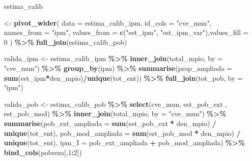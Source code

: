\documentclass[
  12pt,
]{book}
\newenvironment{Shaded}{\begin{snugshade}}{\end{snugshade}}
\newcommand{\AttributeTok}[1]{\textcolor[rgb]{0.13,0.29,0.53}{#1}}
\newcommand{\DecValTok}[1]{\textcolor[rgb]{0.00,0.00,0.81}{#1}}
\newcommand{\FunctionTok}[1]{\textcolor[rgb]{0.13,0.29,0.53}{\textbf{#1}}}
\newcommand{\NormalTok}[1]{#1}
\newcommand{\OtherTok}[1]{\textcolor[rgb]{0.56,0.35,0.01}{#1}}
\newcommand{\SpecialCharTok}[1]{\textcolor[rgb]{0.81,0.36,0.00}{\textbf{#1}}}
\newcommand{\StringTok}[1]{\textcolor[rgb]{0.31,0.60,0.02}{#1}}
\begin{document}
\begin{Shaded}
\begin{Highlighting}[]
\NormalTok{  estima\_calib}

 \OtherTok{\textless{}{-}} \FunctionTok{pivot\_wider}\NormalTok{(}
    \AttributeTok{data =}\NormalTok{ estima\_calib\_ipm,}
    \AttributeTok{id\_cols =} \StringTok{"cve\_mun"}\NormalTok{,}
    \AttributeTok{names\_from =} \StringTok{"ipm"}\NormalTok{,}
    \AttributeTok{values\_from =} \FunctionTok{c}\NormalTok{(}\StringTok{"est\_ipm"}\NormalTok{, }\StringTok{"est\_ipm\_var"}\NormalTok{),}\AttributeTok{values\_fill =} \DecValTok{0}
\NormalTok{  ) }\SpecialCharTok{\%\textgreater{}\%} \FunctionTok{full\_join}\NormalTok{(estima\_calib\_pob)}

\NormalTok{  valida\_ipm }\OtherTok{\textless{}{-}}\NormalTok{ estima\_calib\_ipm }\SpecialCharTok{\%\textgreater{}\%} \FunctionTok{inner\_join}\NormalTok{(total\_mpio, }\AttributeTok{by =} \StringTok{"cve\_mun"}\NormalTok{) }\SpecialCharTok{\%\textgreater{}\%} 
    \FunctionTok{group\_by}\NormalTok{(ipm) }\SpecialCharTok{\%\textgreater{}\%} 
    \FunctionTok{summarise}\NormalTok{(}\AttributeTok{prop\_ampliada =} \FunctionTok{sum}\NormalTok{(est\_ipm}\SpecialCharTok{*}\NormalTok{den\_mpio)}\SpecialCharTok{/}\FunctionTok{unique}\NormalTok{(tot\_ent)) }\SpecialCharTok{\%\textgreater{}\%} 
    \FunctionTok{full\_join}\NormalTok{(tot\_pob, }\AttributeTok{by =} \StringTok{"ipm"}\NormalTok{)}

\NormalTok{  valida\_pob }\OtherTok{\textless{}{-}}\NormalTok{ estima\_calib\_pob }\SpecialCharTok{\%\textgreater{}\%} \FunctionTok{select}\NormalTok{(cve\_mun, est\_pob\_ext , est\_pob\_mod) }\SpecialCharTok{\%\textgreater{}\%} 
    \FunctionTok{inner\_join}\NormalTok{(total\_mpio, }\AttributeTok{by =} \StringTok{"cve\_mun"}\NormalTok{) }\SpecialCharTok{\%\textgreater{}\%}
    \FunctionTok{summarise}\NormalTok{(}\AttributeTok{pob\_ext\_ampliada =} \FunctionTok{sum}\NormalTok{(est\_pob\_ext }\SpecialCharTok{*}\NormalTok{ den\_mpio) }\SpecialCharTok{/} \FunctionTok{unique}\NormalTok{(tot\_ent),}
              \AttributeTok{pob\_mod\_ampliada =} \FunctionTok{sum}\NormalTok{(est\_pob\_mod }\SpecialCharTok{*}\NormalTok{ den\_mpio) }\SpecialCharTok{/} \FunctionTok{unique}\NormalTok{(tot\_ent),}
              \AttributeTok{ipm\_I =}\NormalTok{ pob\_ext\_ampliada }\SpecialCharTok{+}\NormalTok{ pob\_mod\_ampliada) }\SpecialCharTok{\%\textgreater{}\%} 
    \FunctionTok{bind\_cols}\NormalTok{(pobreza[,}\DecValTok{1}\SpecialCharTok{:}\DecValTok{2}\NormalTok{])}


\end{Highlighting}
\end{Shaded}
\end{document}
